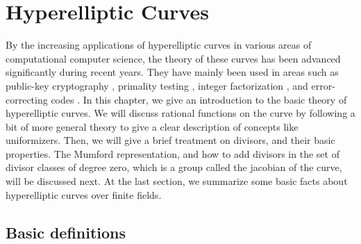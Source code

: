 \chapter{Hyperelliptic Curves}
\label{chapter:hyperelliptic}

By the increasing applications of hyperelliptic curves in various areas of computational computer 
science, the theory of these curves has been advanced significantly during recent years. They have 
mainly been used in areas such as public-key cryptography \cite{Koblitz1989, Cohen2006}, primality 
testing \cite{AdlemanHuang1992}, integer factorization \cite{Lenstra1993, Lenstra2002}, and 
error-correcting codes \cite{LeBrigand1991}. In this chapter, we give an introduction to the basic 
theory of hyperelliptic curves. We will discuss rational functions on the curve by following a bit 
of more general theory to give a clear description of concepts like uniformizers. Then, we will give 
a brief treatment on divisors, and their basic properties. The Mumford representation, and how to 
add divisors in the set of divisor classes of degree zero, which is a group called the jacobian of 
the curve, will be discussed next. At the last section, we summarize some basic facts about 
hyperelliptic curves over finite fields.









\section{Basic definitions}

